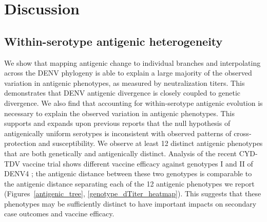 \documentclass[11pt,oneside,letterpaper]{article}
\begin{document}
\pagebreak

\section*{Discussion}

\subsection*{Within-serotype antigenic heterogeneity}
We show that mapping antigenic change to individual branches and interpolating across the DENV phylogeny is able to explain a large majority of the observed variation in antigenic phenotypes, as measured by neutralization titers.
This demonstrates that DENV antigenic divergence is closely coupled to genetic divergence.
We also find that accounting for within-serotype antigenic evolution is necessary to explain the observed variation in antigenic phenotypes.
This supports and expands upon previous reports \citep{katzelnick2015dengue} that the null hypothesis of antigenically uniform serotypes is inconsistent with observed patterns of cross-protection and susceptibility.
We observe at least 12 distinct antigenic phenotypes that are both genetically and antigenically distinct.
Analysis of the recent CYD-TDV vaccine trial shows different vaccine efficacy against genotypes I and II of DENV4 \citep{juraska2018viral}; the antigenic distance between these two genotypes is comparable to the antigenic distance separating each of the 12 antigenic phenotypes we report (Figures~\ref{antigenic_tree}, \ref{genotype_dTiter_heatmap}).
This suggests that these phenotypes may be sufficiently distinct to have important impacts on secondary case outcomes and vaccine efficacy.
\end{document}
